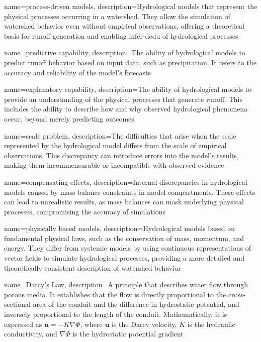 {
    name=process-driven models,
    description={Hydrological models that represent the physical processes occurring in a watershed. They allow the simulation of watershed behavior even without empirical observations, offering a theoretical basis for runoff generation and enabling \gls{infer-dedu} of hydrological processes}
}

{
    name=predictive capability,
    description={The ability of hydrological models to predict runoff behavior based on input data, such as precipitation. It refers to the accuracy and reliability of the model's forecasts}
}

{
    name=explanatory capability,
    description={The ability of hydrological models to provide an understanding of the physical processes that generate runoff. This includes the ability to describe how and why observed hydrological phenomena occur, beyond merely predicting outcomes}
}

{
    name=scale problem,
    description={The difficulties that arise when the scale represented by the hydrological model differs from the scale of empirical observations. This discrepancy can introduce errors into the model's results, making them incommensurable or incompatible with observed evidence}
}

{
    name=compensating effects,
    description={Internal discrepancies in hydrological models caused by mass balance constraints in model compartments. These effects can lead to unrealistic results, as mass balances can mask underlying physical processes, compromising the accuracy of simulations}
}

{
    name=physically based models,
    description={Hydrological models based on fundamental physical laws, such as the conservation of mass, momentum, and energy. They differ from systemic models by using continuous representations of vector fields to simulate hydrological processes, providing a more detailed and theoretically consistent description of watershed behavior}
}

{
    name=Darcy's Law,
    description={A principle that describes water flow through porous media. It establishes that the flow is directly proportional to the cross-sectional area of the conduit and the difference in hydrostatic potential, and inversely proportional to the length of the conduit. Mathematically, it is expressed as $\textbf{u} = -K \nabla \Phi$, where $\textbf{u}$ is the Darcy velocity, $K$ is the hydraulic conductivity, and $\nabla \Phi$ is the hydrostatic potential gradient}
}


